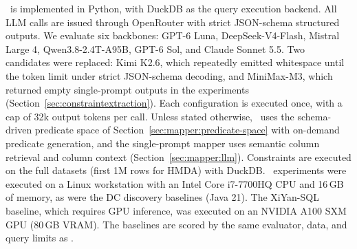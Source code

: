 \system\ is implemented in Python, with DuckDB as the query execution backend.
All LLM calls are issued through OpenRouter with strict JSON-schema structured
outputs. We evaluate six backbones: GPT-6 Luna, DeepSeek-V4-Flash, Mistral Large 4,
Qwen3.8-2.4T-A95B, GPT-6 Sol, and Claude Sonnet 5.5. Two candidates were replaced: Kimi K2.6,
which repeatedly emitted whitespace until the token limit under strict
JSON-schema decoding, and MiniMax-M3, which returned empty single-prompt outputs
in the experiments (Section~\ref{sec:constraintextraction}). Each configuration is executed once, with a cap of 32k
output tokens per call. Unless stated otherwise, \system\ uses the schema-driven
predicate space of Section~\ref{sec:mapper:predicate-space} with on-demand predicate
generation, and the single-prompt mapper uses semantic column retrieval and
column context (Section~\ref{sec:mapper:llm}). Constraints are executed on the
full datasets (first 1M rows for HMDA) with DuckDB. \system\ experiments were
executed on a Linux workstation with an Intel Core i7-7700HQ CPU and 16\,GB of
memory, as were the DC discovery baselines (Java 21). The XiYan-SQL
baseline, which requires GPU inference, was executed on an
NVIDIA A100 SXM GPU (80\,GB VRAM). The baselines are scored by the same
evaluator, data, and query limits as \system.





